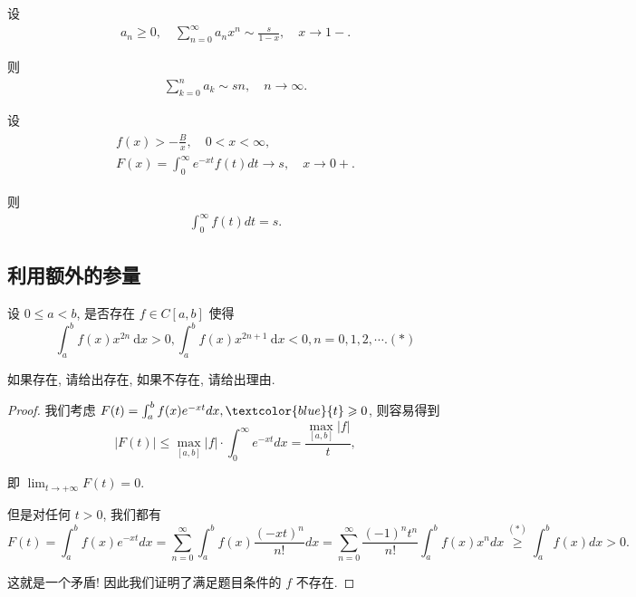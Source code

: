 \begin{corollary}
    设
    \begin{align*}
        a_n \geq 0, \quad \sum_{n=0}^{\infty} a_n x^n \sim \frac{s}{1-x}, \quad x \rightarrow 1-.
    \end{align*}

    则
    \begin{align*}
        \sum_{k=0}^n a_k \sim s n, \quad n \rightarrow \infty .
    \end{align*}
\end{corollary}

\begin{theorem}\label{memeda1}
    设
    \begin{align*}
        \begin{gathered}
            f(x)>-\frac{B}{x}, \quad 0<x<\infty, \\
            F(x)=\int_0^{\infty} e^{-x t} f(t) d t \rightarrow s, \quad x \rightarrow 0+.
        \end{gathered}
    \end{align*}

    则
    \begin{align*}
        \int_0^{\infty} f(t) d t=s .
    \end{align*}
\end{theorem}

\subsection{利用额外的参量}

\begin{exercise}
设 $0 \leqslant a<b$, 是否存在 $f \in C[a, b]$ 使得
$$
    \int_a^b f(x) x^{2 n} \mathrm{~d} x>0, \int_a^b f(x) x^{2 n+1} \mathrm{~d} x<0, n=0,1,2, \cdots .(*)
$$

如果存在, 请给出存在, 如果不存在, 请给出理由.
\end{exercise}

\begin{proof}
    我们考虑 $F(t)=\int_a^b f(x) e^{-x t} d x, \textcolor{blue}{t} \geqslant 0$, 则容易得到
    $$
        |F(t)| \leqslant \max _{[a, b]}|f| \cdot \int_0^{\infty} e^{-x t} d x=\frac{\max _{[a, b]}|f|}{t},
    $$

    即 $\lim _{t \rightarrow+\infty} F(t)=0$.

    但是对任何 $t>0$, 我们都有
    $$
        F(t)=\int_a^b f(x) e^{-x t} d x=\sum_{n=0}^{\infty} \int_a^b f(x) \frac{(-x t)^n}{n!} d x=\sum_{n=0}^{\infty} \frac{(-1)^n t^n}{n!} \int_a^b f(x) x^n d x \stackrel{(*)}{\geqslant} \int_a^b f(x) d x>0 .
    $$

    这就是一个矛盾! 因此我们证明了满足题目条件的 $f$ 不存在.
\end{proof}

